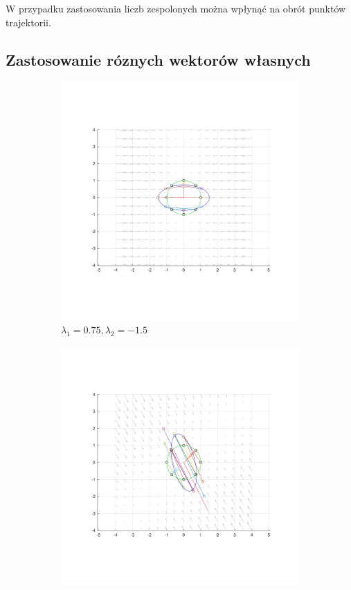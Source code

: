 \documentclass[]{article}
\begin{document}
W przypadku zastosowania liczb zespolonych można wpłynąć na obrót punktów trajektorii.

\subsection{Zastosowanie róznych wektorów własnych}

\begin{figure}[H]
	\centering
 	\begin{subfigure}{.5\textwidth}
		\centering
		\includegraphics[width=0.99\linewidth]{normal_075_-15}
		\caption{$\lambda_1 = 0.75, \lambda_2 = -1.5$}
		\label{fig:rotation1}
	\end{subfigure}%
	\begin{subfigure}{.5\textwidth}
		\centering
		\includegraphics[width=0.99\linewidth]{rotated_075_-15}

\end{subfigure}
\end{figure}
\end{document}
